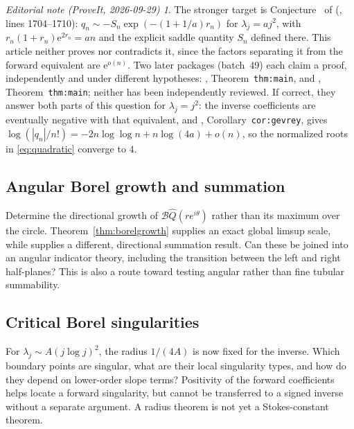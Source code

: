 \documentclass[11pt,a4paper]{article}
\numberwithin{equation}{section}
\theoremstyle{definition}
\theoremstyle{remark}
\newtheorem*{ednote}{Editorial note (ProveIt, 2026-09-29)}
\newcommand{\B}{\mathcal B}
\newcommand{\ee}{\mathrm e}
\newcommand{\Q}{\widehat Q}
\begin{document}
\begin{ednote}
The stronger target is Conjecture~ of
\cite{ed:fcu}
(,
lines 1704--1710): $q_n\sim-S_n\exp(-(1+1/a)r_n)$ for $\lambda_j=aj^2$,
with $r_n(1+r_n)\ee^{2r_n}=an$ and the explicit saddle quantity $S_n$
defined there. This article neither proves nor
contradicts it, since the factors separating it from the forward
equivalent are $\ee^{o(n)}$. Two later packages (batch~49) each claim a
proof, independently and under different hypotheses: \cite{ed:qef},
Theorem~\texttt{thm:main}, and \cite{ed:sqf}, Theorem~\texttt{thm:main};
neither has been independently reviewed. If correct, they answer both
parts of this question for $\lambda_j=j^2$: the inverse coefficients are
eventually negative with that equivalent, and \cite{ed:sqf},
Corollary~\texttt{cor:gevrey}, gives
$\log(|q_n|/n!)=-2n\log\log n+n\log(4a)+o(n)$, so the normalized roots
in \eqref{eq:quadratic} converge to $4$.
\end{ednote}

\subsection{Angular Borel growth and summation}

Determine the directional growth of $\B\Q(re^{i\theta})$ rather than
its maximum over the circle. Theorem~\ref{thm:borelgrowth} supplies an
exact global limsup scale, while \cite{negativeray} supplies a different,
directional summation result. Can these be joined into an angular
indicator theory, including the transition between the left and right
half-planes? This is also a route toward testing angular rather than
fine tubular summability.

\subsection{Critical Borel singularities}

For $\lambda_j\sim A(j\log j)^2$, the radius $1/(4A)$ is now fixed
for the inverse. Which boundary points are singular, what are their
local singularity types, and how do they depend on lower-order slope
terms? Positivity of the forward coefficients helps locate a forward
singularity, but cannot be transferred to a signed inverse without a
separate argument. A radius theorem is not yet a Stokes-constant theorem.
\end{document}
